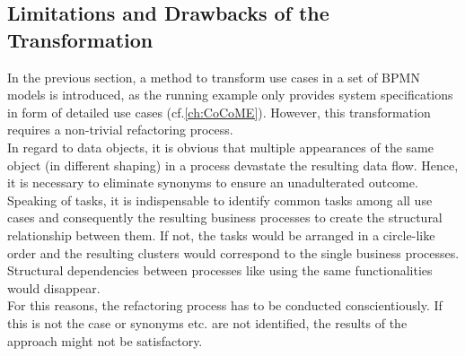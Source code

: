 \subsection{Limitations and Drawbacks of the Transformation}
In the previous section, a method to transform use cases in a set of BPMN models is introduced, as the running example only provides system specifications in form of detailed use cases (cf.\ref{ch:CoCoME}). However, this transformation requires a non-trivial refactoring process. \\
In regard to data objects, it is obvious that multiple appearances of the same object (in different shaping) in a process devastate the resulting data flow. Hence, it is necessary to eliminate synonyms to ensure an unadulterated outcome.\\
Speaking of tasks, it is indispensable to identify common tasks among all use cases and consequently the resulting business processes to create the structural relationship between them. If not, the tasks would be arranged in a circle-like order and the resulting clusters would correspond to the single business processes. Structural dependencies between processes like using the same functionalities would disappear.\\
For this reasons, the refactoring process has to be conducted 
conscientiously. If this is not the case or synonyms etc. are not identified, the results of the approach might not be satisfactory.



\pagebreak

